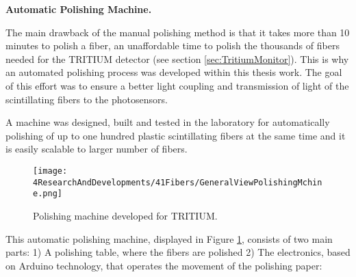 \textbf{Automatic Polishing Machine.}

The main drawback of the manual polishing method is that it takes more than 10 minutes to polish a fiber, an unaffordable time to polish the thousands of fibers needed for the TRITIUM detector (see section \ref{sec:TritiumMonitor}). This is why an automated polishing process was developed within this thesis work. The goal of this effort was to ensure a better light coupling and transmission of light of the scintillating fibers to the photosensors. 



A machine was designed, built and tested in the laboratory for automatically polishing of up to one hundred plastic scintillating fibers at the same time and it is easily scalable to larger number of fibers.

\begin{figure}[h]
\centering
\texttt{[image: 4ResearchAndDevelopments/41Fibers/GeneralViewPolishingMchine.png]}
\caption{Polishing machine developed for TRITIUM.\label{fig:GeneralViewPolishingMachine}}
\end{figure}
This automatic polishing machine, displayed in Figure \ref{fig:GeneralViewPolishingMachine}, consists of two main parts: 1) A polishing table, where the fibers are polished 2) The electronics, based on Arduino technology, that operates the movement of the polishing paper:

